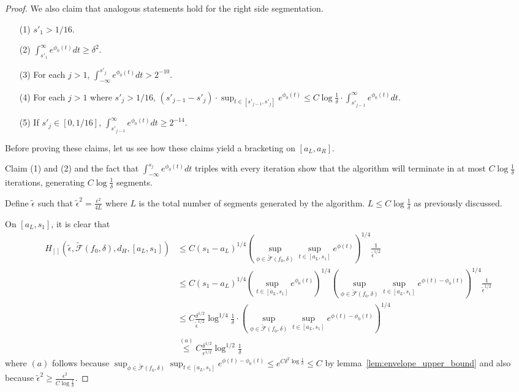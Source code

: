 \documentclass[12pt]{article}
\begin{document}
\begin{proof}
  We also claim that analogous statements hold for the right side segmentation.
  \begin{enumerate}
  \item[(1)]  $s'_1 > 1/16$.
  \item[(2)] $\int_{s'_1}^{\infty} e^{\phi_0(t)}dt \geq \delta^2$.
  \item[(3)] For each $j > 1$, $\int_{-\infty}^{s'_j} e^{\phi_0(t)} dt > 2^{-10}$.
  \item[(4)] For each $j > 1$ where $s'_j > 1/16$, $(s'_{j-1} - s'_j) \cdot \sup_{t \in [s'_{j-1}, s'_j]} e^{\phi_0(t)} \leq C \log \frac{1}{\delta} \cdot \int_{s'_{j-1}}^{\infty} e^{\phi_0(t)} dt$.
  \item[(5)] If $s'_j \in [0, 1/16]$, $\int_{s'_{j-1}}^{\infty} e^{\phi_0(t)} dt \geq 2^{-14}$. 
  \end{enumerate}

  Before proving these claims, let us see how these claims yield a bracketing on $[a_L, a_R]$.

  Claim (1) and (2) and the fact that $\int_{-\infty}^{s_j} e^{\phi_0(t)}dt$ triples with every iteration show that the algorithm will terminate in at most $C \log \frac{1}{\delta}$ iterations, generating $C \log \frac{1}{\delta}$ segments.

  Define $\tilde{\epsilon}$ such that $\tilde{\epsilon}^2 = \frac{\epsilon^2}{4 L}$ where $L$ is the total number of segments generated by the algorithm. $L \leq C \log \frac{1}{\delta}$ as previously discussed.

  On $[a_L, s_1]$, it is clear that
  \begin{align*}
    H_{[]}(\tilde{\epsilon}, \tilde{\mathcal{F}}(f_0, \delta), d_H, [a_L, s_1])
    &\leq C (s_1 - a_L)^{1/4}
      \left( \sup_{\phi \in \tilde{\mathcal{F}}(f_0, \delta) }\sup_{t \in [a_L, s_1]} e^{\phi(t)} \right)^{1/4}
      \frac{1}{\tilde{\epsilon}^{1/2}} \\
    &\leq C (s_1 - a_L)^{1/4}
      \left(\sup_{t \in [a_L, s_1]} e^{\phi_0(t)} \right)^{1/4} 
      \left( \sup_{\phi \in \tilde{\mathcal{F}}(f_0, \delta) }\sup_{t \in [a_L, s_1]} e^{\phi(t) - \phi_0(t)} \right)^{1/4} 
      \frac{1}{\tilde{\epsilon}^{1/2}} \\
    &\leq C \frac{\delta^{1/2}}{\tilde{\epsilon}^{1/2}}  \log^{1/4} \frac{1}{\delta} \cdot \left( \sup_{\phi \in \tilde{\mathcal{F}}(f_0, \delta) }\sup_{t \in [a_L, s_1]} e^{\phi(t) - \phi_0(t)} \right)^{1/4}  \\
    &\stackrel{(a)} \leq C  \frac{\delta^{1/2}}{\epsilon^{1/2}} \log^{1/2} \frac{1}{\delta}
  \end{align*}
  where $(a)$ follows because $ \sup_{\phi \in \tilde{\mathcal{F}}(f_0, \delta) }\sup_{t \in [a_L, s_1]} e^{\phi(t) - \phi_0(t)} \leq e^{C \delta^2 \log \frac{1}{\delta}} \leq C$ by lemma~\ref{lem:envelope_upper_bound} and also because $\tilde{\epsilon}^2 \geq \frac{\epsilon^2 }{C \log \frac{1}{\delta}}$.


\end{proof}
\end{document}
